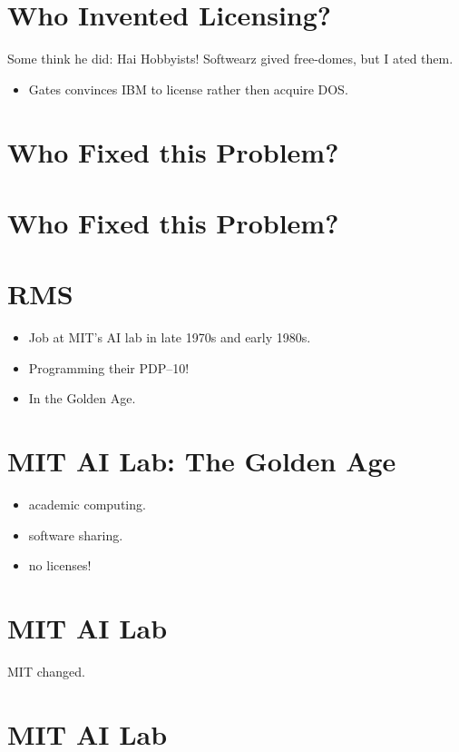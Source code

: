 \documentclass{article}
\begin{document}
\section{Who Invented Licensing?}

Some think he did:
Hai Hobbyists! Softwearz gived free-domes, but I ated them.
\begin{itemize}
\item 
  Gates convinces IBM to license rather then acquire DOS.
\end{itemize}
\section{Who Fixed this Problem?}

\section{Who Fixed this Problem?}

\section{RMS}

\begin{itemize}
\item 
  Job at MIT's AI lab in late 1970s and early 1980s.

\item 
  Programming their PDP--10!

\item 
  In the Golden Age.

\end{itemize}
\section{MIT AI Lab: The Golden Age}

\begin{itemize}
\item 
  academic computing.
\item 
  software sharing.
\item 
  no licenses!
\end{itemize}
\section{MIT AI Lab}

MIT changed.

\section{MIT AI Lab}
\end{document}
